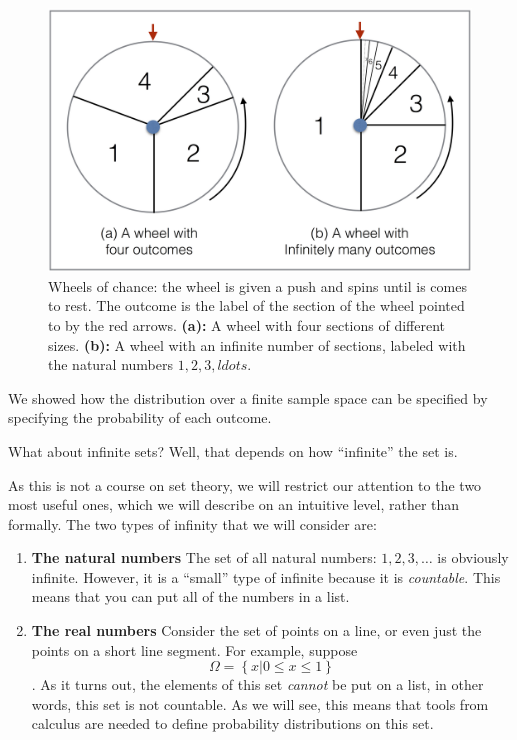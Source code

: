 \begin{figure}[th]
\begin{center}
\includegraphics[width=5in]{figs/WheelsOfChanceFiniteCoutable.png}
\end{center}
\caption{Wheels of chance: the wheel is given a push and spins until
  is comes to rest. The outcome is the label of the section of the
  wheel pointed to by the red arrows. {\bf(a):} A wheel with four
  sections of different sizes. {\bf(b):} A wheel with an infinite
  number of sections, labeled with the natural numbers $1,2,3,ldots$.
\label{fig:Wheel-of-chance}}
\end{figure}



We showed how the distribution over a finite sample space can be
specified by specifying the probability of each outcome.

What about infinite sets? Well, that depends on how ``infinite'' the set is.

As this is not a course on set theory, we will restrict our attention
to the two most useful ones, which we will describe on an intuitive
level, rather than formally. The two types of infinity that we will
consider are:
\begin{enumerate}
\item {\bf The natural numbers} The set of all natural numbers:
  $1,2,3,\ldots$ is obviously infinite. However, it is a ``small''
  type of infinite because it is {\em countable}. This means that you
  can put all of the numbers in a list.
\item{\bf The real numbers} Consider the set of points on a line, or
  even just the points on a short line segment. For example, suppose 
\[ \Omega = \left\{x | 0 \leq x \leq 1 \right\} \].
  As it turns out, the elements of this set {\em cannot} be put
  on a list, in other words, this set is not countable. As we will
  see, this means that tools from calculus are needed to define
  probability distributions on this set.
\end{enumerate}

